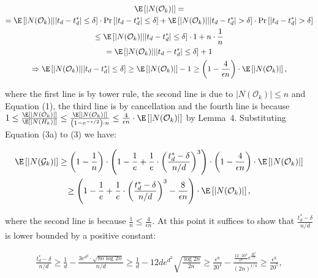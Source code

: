 \documentclass[10pt,a4paper]{article}
\begin{document}
\[\begin{gathered}
\displaystyle\E \displaystyle\left[|N(\mathcal{O}_{k})|\right]= \\
\displaystyle=\E\left[|N(\mathcal{O}_{k})|\middle||t_{d}-t^{*}_{d}|\leq\delta\right]\cdot\Pr\left[|t_{d}-t^{*}_{d}|\leq\delta\right]+\E\left[|N(\mathcal{O}_{k})|\middle||t_{d}-t^{*}_{d}|>\delta\right]\cdot\Pr\left[|t_{d}-t^{*}_{d}|>\delta\right] \\
\displaystyle\leq\E\left[|N(\mathcal{O}_{k})|\middle||t_{d}-t^{*}_{d}|\leq\delta\right]\cdot 1+n\cdot\frac{1}{n} \\
\displaystyle=\E\left[|N(\mathcal{O}_{k})|\middle||t_{d}-t^{*}_{d}|\leq\delta\right]+1 \\
\displaystyle\Rightarrow\E\left[|N(\mathcal{O}_{k})|\middle||t_{d}-t^{*}_{d}|\leq\delta\right]\geq\E\left[|N(\mathcal{O}_{k})|\right]-1\geq\left(1-\frac{4}{\epsilon n}\right)\cdot\E\left[|N(\mathcal{O}_{k})|\right],
\end{gathered}\]


where the first line is by tower rule, the second line is due to $|N(\mathcal{O}_{k})|\leq n$ and Equation (1), the third line is by cancellation and the fourth line is because $1\leq\frac{\E\left[|N(\mathcal{O}_{k})|\right]}{\E\left[|N(H_{k})|\right]}\leq\frac{\E\left[|N(\mathcal{O}_{k})|\right]}{\left(1-e^{-\epsilon/2}\right)\cdot n}\leq\frac{4}{\epsilon n}\cdot\E\left[|N(\mathcal{O}_{k})|\right]$ by Lemma 4.
Substituting Equation (3a) to (3) we have:\par


\[\begin{gathered}
\displaystyle\E\left[|N(\mathcal{G}_{k})|\right] \displaystyle\geq\left(1-\frac{1}{n}\right)\cdot\left(1-\frac{1}{e}+\frac{1}{e}\cdot\left(\frac{t^{*}_{d}-\delta}{n/d}\right)^{3}\right)\cdot\left(1-\frac{4}{\epsilon n}\right)\cdot\E\left[|N(\mathcal{O}_{k})|\right] \\
\displaystyle\geq\left(1-\frac{1}{e}+\frac{1}{e}\cdot\left(\frac{t^{*}_{d}-\delta}{n/d}\right)^{3}-\frac{8}{\epsilon n}\right)\cdot\E\left[|N(\mathcal{O}_{k})|\right],
\end{gathered}\]


where the second line is because $\frac{1}{n}\leq\frac{4}{\epsilon n}$.
At this point it suffices to show that $\frac{t^{*}_{d}-\delta}{n/d}$ is lower bounded by a positive constant:\par


\[\begin{gathered}
\displaystyle\frac{t^{*}_{d}-\delta}{n/d}\geq\frac{1}{d}-\frac{3e^{d^{2}}\cdot\sqrt{8n\log{2n}}}{n/d}\geq\frac{1}{d}-12de^{d^{2}}\sqrt{\frac{\log{2n}}{2n}}\geq\frac{\epsilon^{8}}{20^{4}}-\frac{\frac{12\cdot 20^{4}}{\epsilon^{8}}e^{\frac{20^{4}}{\epsilon^{8}}}}{(2n)^{1/4}}\geq\frac{\epsilon^{8}}{20^{5}},
\end{gathered}\]
\end{document}
